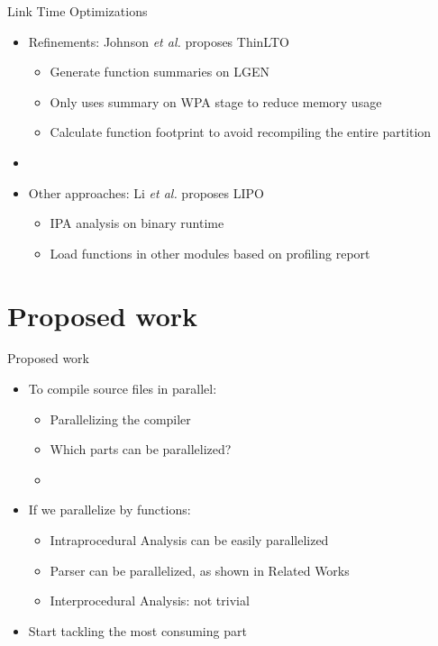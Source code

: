 
\begin{frame}{Link Time Optimizations}

\begin{itemize}
    
    \item Refinements: Johnson \textit{et al.} \cite{thinlto} proposes ThinLTO
    \begin{itemize}
        \item Generate function summaries on LGEN
        \item Only uses summary on WPA stage to reduce memory usage
        \item Calculate function footprint to avoid recompiling the entire partition
    \end{itemize}
    \item[]

    \item Other approaches: Li \textit{et al.} \cite{lipo} proposes LIPO
    \begin{itemize}
        \item IPA analysis on binary runtime
        \item Load functions in other modules based on profiling report
    \end{itemize}
\end{itemize}

\end{frame}

\section{Proposed work}

\begin{frame}{Proposed work}

\begin{itemize}
    \item To compile source files in parallel:
    \begin{itemize}
        \item Parallelizing the compiler
        \item Which parts can be parallelized?
        \item[]
    \end{itemize}
    \item If we parallelize by functions:
    \begin{itemize}
        \item Intraprocedural Analysis can be easily parallelized
        \item Parser can be parallelized, as shown in Related Works
        \item Interprocedural Analysis: not trivial
    \end{itemize}
    \item Start tackling the most consuming part
\end{itemize}

\end{frame}

